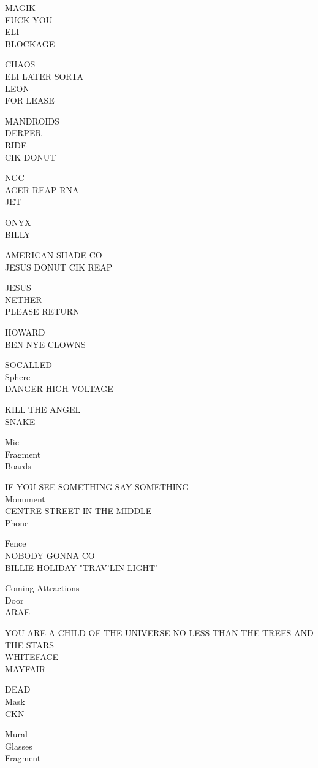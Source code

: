 \documentclass[10pt,letterpaper]{article}
\begin{document}
MAGIK\\
FUCK YOU\\
ELI\\
BLOCKAGE

CHAOS\\
ELI LATER SORTA\\
LEON\\
FOR LEASE

MANDROIDS\\
DERPER\\
RIDE\\
CIK DONUT

NGC\\
ACER REAP RNA\\
JET

ONYX\\
BILLY

AMERICAN SHADE CO\\
JESUS DONUT CIK REAP

JESUS\\
NETHER\\
PLEASE RETURN

HOWARD\\
BEN NYE CLOWNS

SOCALLED\\
Sphere\\
DANGER HIGH VOLTAGE

KILL THE ANGEL\\
SNAKE

Mic\\
Fragment\\
Boards

IF YOU SEE SOMETHING SAY SOMETHING\\
Monument\\
CENTRE STREET IN THE MIDDLE\\
Phone

Fence\\
NOBODY GONNA CO\\
BILLIE HOLIDAY "TRAV'LIN LIGHT"

Coming Attractions\\
Door\\
ARAE

YOU ARE A CHILD OF THE UNIVERSE NO LESS THAN THE TREES AND THE STARS\\
WHITEFACE\\
MAYFAIR

DEAD\\
Mask\\
CKN

Mural\\
Glasses\\
Fragment
\end{document}
